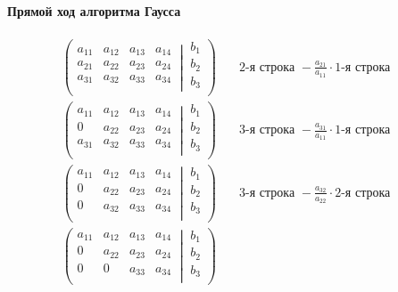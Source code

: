 \paragraph{Прямой ход алгоритма Гаусса}
\begin{align*}
\left(\left.
\begin{matrix}
a_{11}& a_{12}&a_{13}& a_{14}\\
a_{21}& a_{22}&a_{23}& a_{24}\\
a_{31}& a_{32}&a_{33}& a_{34}\\
\end{matrix}
\:\right|\:
\begin{matrix}
b_1\\
b_2\\
b_3\\
\end{matrix}
\right)&
\quad 2\text{-я строка }-\frac{a_{21}}{a_{11}}\cdot1\text{-я строка}\quad\\
\left(\left.
\begin{matrix}
a_{11}& a_{12}&a_{13}& a_{14}\\
0& a_{22}&a_{23}& a_{24}\\
a_{31}& a_{32}&a_{33}& a_{34}\\
\end{matrix}
\:\right|\:
\begin{matrix}
b_1\\
b_2\\
b_3\\
\end{matrix}
\right)&
\quad 3\text{-я строка }-\frac{a_{31}}{a_{11}}\cdot1\text{-я строка}\quad\\
\left(\left.
\begin{matrix}
a_{11}& a_{12}&a_{13}& a_{14}\\
0& a_{22}&a_{23}& a_{24}\\
0& a_{32}&a_{33}& a_{34}\\
\end{matrix}
\:\right|\:
\begin{matrix}
b_1\\
b_2\\
b_3\\
\end{matrix}
\right)&
\quad 3\text{-я строка }-\frac{a_{32}}{a_{22}}\cdot2\text{-я строка}\quad\\
\left(\left.
\begin{matrix}
a_{11}& a_{12}&a_{13}& a_{14}\\
0& a_{22}&a_{23}& a_{24}\\
0& 0&a_{33}& a_{34}\\
\end{matrix}
\:\right|\:
\begin{matrix}
b_1\\
b_2\\
b_3\\
\end{matrix}
\right)&
\end{align*}
